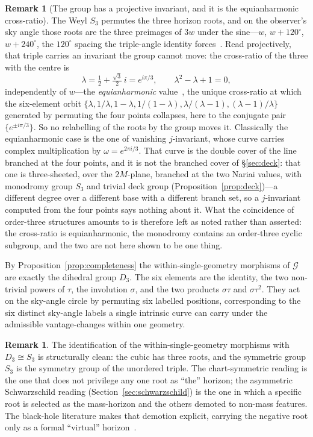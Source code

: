 \documentclass[11pt,a4paper]{article}
\theoremstyle{definition}
\newtheorem{remark}[theorem]{Remark}
\begin{document}
\begin{remark}[The group has a projective invariant, and it is the equianharmonic cross-ratio]\label{rem:equianharmonic}
The Weyl $S_{3}$ permutes the three horizon roots, and on the observer's sky angle those roots
are the three preimages of $3w$ under the sine---$w$, $w+120^{\circ}$, $w+240^{\circ}$, the
$120^{\circ}$ spacing the triple-angle identity forces~\cite{JanzenSlicing}. Read projectively,
that triple carries an invariant the group cannot move: the cross-ratio of the three with the
centre is
\[
\lambda=\tfrac12+\tfrac{\sqrt3}{2}\,i=e^{i\pi/3},\qquad \lambda^{2}-\lambda+1=0,
\]
independently of $w$---the \emph{equianharmonic} value~\cite{Coxeter1987,SempleKneebone1952}, the unique cross-ratio at which the
six-element orbit $\{\lambda,1/\lambda,1-\lambda,1/(1-\lambda),\lambda/(\lambda-1),(\lambda-1)/\lambda\}$
generated by permuting the four points collapses, here to the conjugate pair
$\{e^{\pm i\pi/3}\}$. So no relabelling of the roots by the group moves it.
Classically the equianharmonic case is the one of vanishing $j$-invariant, whose curve carries
complex multiplication by $\omega=e^{2\pi i/3}$. That curve is the double cover of the line branched
at the four points, and it is not the branched cover of \S\ref{sec:deck}: that one is three-sheeted, over the
$2M$-plane, branched at the two Nariai values, with monodromy group $S_{3}$
and trivial deck group (Proposition~\ref{prop:deck})---a different degree over a different base with a different branch set, so a
$j$-invariant computed from the four points says nothing about it. What the coincidence of
order-three structures amounts to is therefore left as noted rather than asserted: the cross-ratio
is equianharmonic, the monodromy contains an order-three cyclic subgroup, and the two are not here shown to be one
thing.
\end{remark}

By Proposition~\ref{prop:completeness} the within-single-geometry morphisms of $\mathcal{G}$ are exactly the dihedral group $D_{3}$. The six elements are the identity, the two non-trivial powers of $\tau$, the involution $\sigma$, and the two products $\sigma\tau$ and $\sigma\tau^{2}$. They act on the sky-angle circle by permuting six labelled positions, corresponding to the six distinct sky-angle labels a single intrinsic curve can carry under the admissible vantage-changes within one geometry.

\begin{remark}\label{rem:S3}
The identification of the within-single-geometry morphisms with $D_{3}\cong S_{3}$ is structurally clean: the cubic has three roots, and the symmetric group $S_{3}$ is the symmetry group of the unordered triple. The chart-symmetric reading is the one that does not privilege any one root as ``the'' horizon; the asymmetric Schwarzschild reading (Section~\ref{sec:schwarzschild}) is the one in which a specific root is selected as the mass-horizon and the others demoted to non-mass features. The black-hole literature makes that demotion explicit, carrying the negative root only as a formal ``virtual'' horizon~\cite{Visser2013}.
\end{remark}
\end{document}
